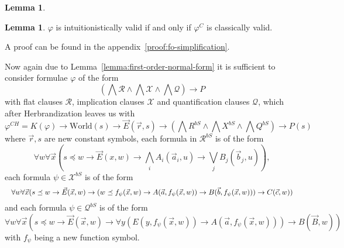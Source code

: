 \documentclass{easychair}
\theoremstyle{definition}
\theoremstyle{definition}
\theoremstyle{definition}
\newtheorem{lemma}[theorem]{Lemma}
\theoremstyle{definition}
\theoremstyle{definition}
\theoremstyle{definition}
\theoremstyle{definition}
\begin{document}
\begin{lemma}
\begin{lemma}\label{lemma:fo-simplification}
	$\varphi$ is intuitionistically valid if and only if $\varphi^C$ is classically valid.
\end{lemma}

A proof can be found in the appendix~\ref*{proof:fo-simplification}.

Now again due to Lemma~\ref{lemma:first-order-normal-form} it is sufficient to consider formulae $\varphi$ of the form $$\left(\bigwedge\mathcal R\wedge\bigwedge\mathcal X\wedge\bigwedge\mathcal Q\right)\to P$$ with flat clauses $\mathcal R$, implication clauses $\mathcal X$ and quantification clauses $\mathcal Q$, which after Herbrandization leaves us with $$\varphi^{CH} = K(\varphi)\to\text{World}(s)\to\vec E(\vec r, s) \to \left(\bigwedge R^{bS}\wedge \bigwedge X^{bS}\wedge\bigwedge Q^{bS}\right)\to P(s)$$
where $\vec r, s$ are new constant symbols, each formula in $\mathcal R^{bS}$ is of the form
$$\forall w \forall \vec x(s\preceq w\to\vec E(x, w)\to\bigwedge_i A_i(\vec a_i, u)\to\bigvee_j B_j(\vec b_j, u)),$$
each formula $\psi\in\mathcal X^{bS}$ is of the form
$$
	\resizebox{\hsize}{!}{$\forall w\forall\vec x(s\preceq w\to\vec E(\vec x, w)\to (w\preceq f_\psi(\vec x, w)\to A(\vec a, f_\psi(\vec x, w))\to B(\vec b, f_\psi(\vec x, w)))\to C(\vec c, w))$}
$$
and each formula $\psi\in\mathcal Q^{bS}$ is of the form
$$\forall w\forall\vec x(s\preceq w\to\vec E(\vec x, w)\to \forall y(E(y, f_\psi(\vec x, w))\to A(\vec a, f_\psi(\vec x, w)))\to B(\vec B, w))$$
with $f_\psi$ being a new function symbol.


\end{lemma}
\end{document}
